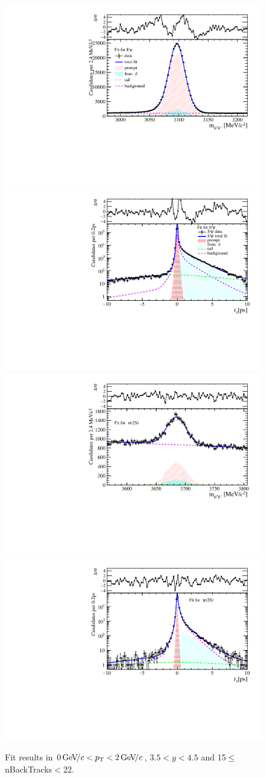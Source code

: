 \begin{figure}[H]
\begin{center}
\includegraphics[width=0.47\linewidth]{pdf/Jpsi/drawmassB/n3y3pt1.pdf}
\includegraphics[width=0.47\linewidth]{pdf/Jpsi/2DFitB/n3y3pt1.pdf}
\vspace*{-0.5cm}
\includegraphics[width=0.47\linewidth]{pdf/Psi2S/drawmassB/n3y3pt1.pdf}
\includegraphics[width=0.47\linewidth]{pdf/Psi2S/2DFitB/n3y3pt1.pdf}
\vspace*{-0.5cm}
\end{center}
\caption{Fit results in $0\text{\,Ge\kern -0.1em V\!/}c<p_{\mathrm{T}}<2\text{\,Ge\kern -0.1em V\!/}c$, $3.5<y<4.5$ and 15$\leq$nBackTracks$<$22.}
\label{Fitn3y3pt1}
\end{figure}
